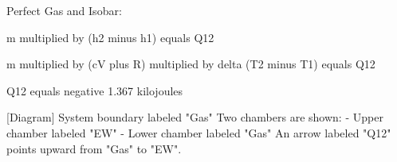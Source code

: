Perfect Gas and Isobar:  

m multiplied by (h2 minus h1) equals Q12  

m multiplied by (cV plus R) multiplied by delta (T2 minus T1) equals Q12  

Q12 equals negative 1.367 kilojoules  

[Diagram]  
System boundary labeled "Gas"  
Two chambers are shown:  
- Upper chamber labeled "EW"  
- Lower chamber labeled "Gas"  
An arrow labeled "Q12" points upward from "Gas" to "EW".
